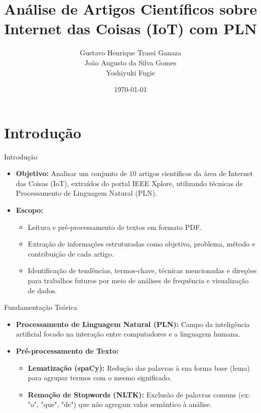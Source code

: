 \documentclass{beamer}
\title{Análise de Artigos Científicos sobre Internet das Coisas (IoT) com PLN}
\subtitle{Gustavo Henrique Trassi Ganaza \\ João Augusto da Silva Gomes \\ Yoshiyuki Fugie}
\institute{
    Universidade Estadual de Maringá \\
    Curso de Ciência da Computação \\
    Disciplina: Introdução a Inteligência Artificial \\
    Professor Dr. Wagner Igarashi
}
\date{\today}
\begin{document}
\maketitle

\section{Introdução}
\begin{frame}{Introdução}
\begin{itemize}
    \item \textbf{Objetivo:} Analisar um conjunto de 10 artigos científicos da área de Internet das Coisas (IoT), extraídos do portal IEEE Xplore, utilizando técnicas de Processamento de Linguagem Natural (PLN).
    \item \textbf{Escopo:}
    \begin{itemize}
        \item Leitura e pré-processamento de textos em formato PDF.
        \item Extração de informações estruturadas como objetivo, problema, método e contribuição de cada artigo.
        \item Identificação de tendências, termos-chave, técnicas mencionadas e direções para trabalhos futuros por meio de análises de frequência e visualização de dados.
    \end{itemize}
\end{itemize}
\end{frame}

\begin{frame}{Fundamentação Teórica}
\begin{itemize}
    \item \textbf{Processamento de Linguagem Natural (PLN):} Campo da inteligência artificial focado na interação entre computadores e a linguagem humana.
    \item \textbf{Pré-processamento de Texto:}
    \begin{itemize}
        \item \textbf{Lematização (spaCy):} Redução das palavras à sua forma base (lema) para agrupar termos com o mesmo significado.
        \item \textbf{Remoção de Stopwords (NLTK):} Exclusão de palavras comuns (ex: "o", "que", "de") que não agregam valor semântico à análise.
    \end{itemize}
\end{itemize}
\end{frame}
\end{document}
